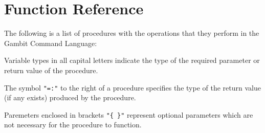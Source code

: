 \section{Function Reference}

The following is a list of procedures with the operations that they
perform in the Gambit Command Language:

Variable types in all capital letters indicate the type of the
required parameter or return value of the procedure.

The symbol {\tt "=:"} to the right of a procedure specifies the type
of the return value (if any exists) produced by the procedure.

Paremeters enclosed in brackets {\tt "\{ \}"} represent optional
parameters which are not necessary for the procedure to function.


